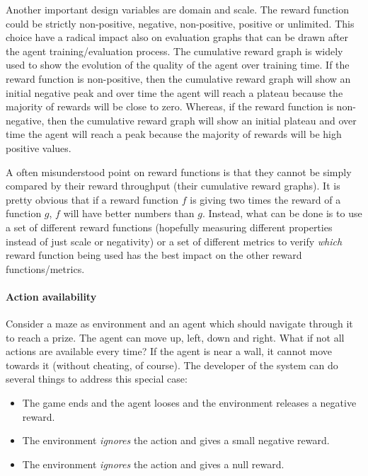 Another important design variables are domain and scale.
The reward function could be strictly non-positive, negative, non-positive, positive or unlimited.
This choice have a radical impact also on evaluation graphs that can be drawn after the agent training/evaluation process.
The cumulative reward graph is widely used to show the evolution of the quality of the agent over training time.
If the reward function is non-positive, then the cumulative reward graph will show an initial negative peak and over time the agent will reach a plateau because the majority of rewards will be close to zero.
Whereas, if the reward function is non-negative, then the cumulative reward graph will show an initial plateau and over time the agent will reach a peak because the majority of rewards will be high positive values.

A often misunderstood point on reward functions is that they cannot be simply compared by their reward throughput (their cumulative reward graphs).
It is pretty obvious that if a reward function $f$ is giving two times the reward of a function $g$, $f$ will have better numbers than $g$.
Instead, what can be done is to use a set of different reward functions (hopefully measuring different properties instead of just scale or negativity) or a set of different metrics to verify \textit{which} reward function being used has the best impact on the other reward functions/metrics.

\paragraph{Action availability}

Consider a maze as environment and an agent which should navigate through it to reach a prize. The agent can move up, left, down and right.
What if not all actions are available every time? If the agent is near a wall, it cannot move towards it (without cheating, of course).
The developer of the system can do several things to address this special case:

\begin{itemize}
  \item The game ends and the agent looses and the environment releases a negative reward.
  \item The environment \textit{ignores} the action and gives a small negative reward.
  \item The environment \textit{ignores} the action and gives a null reward.
\end{itemize}

